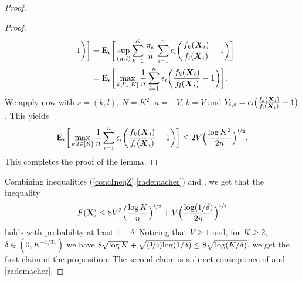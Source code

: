 \begin{proof}
\begin{proof}
\begin{align}
		-1\bigg) \bigg]
		&= \mathbf E_{\epsilon}\bigg[ \sup_{(\boldsymbol \pi,l)} \sum_{k=1}^K \frac{\pi_k}{n}\sum_{i=1}^n \epsilon_i
		\bigg(\frac{f_{k}(\boldsymbol X_i)}{f_l(\boldsymbol X_i)} -1\bigg)  \bigg]\nonumber\\
		&=\mathbf E_{\epsilon}\bigg[ \max_{k,l\in[K]} \frac{1}{n}\sum_{i=1}^n \epsilon_i
		\bigg(\frac{f_{k}(\boldsymbol X_i)}{f_l(\boldsymbol X_i)} -1\bigg) \bigg].
		\end{align}
		We apply now  with $s= (k,l)$, $N = K^2$, $a=-V$, $b= V$ and $Y_{i,s} = \epsilon_i
		\big(\frac{f_{k}(\boldsymbol X_i)}{f_l(\boldsymbol X_i)} -1\big)$. This yields
		\begin{align}
		\mathbf E_{\epsilon}\bigg[ \max_{k,l\in[K]}  \frac{1}{n}\sum_{i=1}^n \epsilon_i
		\bigg(\frac{f_{k}(\boldsymbol X_i)}{f_l(\boldsymbol X_i)} -1\bigg) \bigg]
		\le 2V \Big(\frac{\log K^2}{2n}\Big)^{\nicefrac12}.
		\end{align}
		This completes the proof of the lemma.
	\end{proof}
	Combining inequalities (\ref{concIneqZ},\ref{rademacher}) and , we get that the inequality
	\begin{equation}
	F(\mathbf X) \le 8V^3\Big(\frac{\log K}{n}\Big)^{\nicefrac12}+ V\Big(\frac{\log(1/\delta)}{2n}\Big)^{\nicefrac12}
	\end{equation}
	holds with probability at least $1-\delta$. Noticing that $V\ge 1$ and, for $K\ge 2$, $\delta\in(0,K^{-1/31})$
	we have $8\sqrt{\log K}+ \sqrt{(\nicefrac12){\log(1/\delta)}}\le 8\sqrt{\log(K/\delta)}$,
	we get the first claim of the proposition. The second claim is a direct consequence
	of  and \eqref{rademacher}.
\end{proof}

